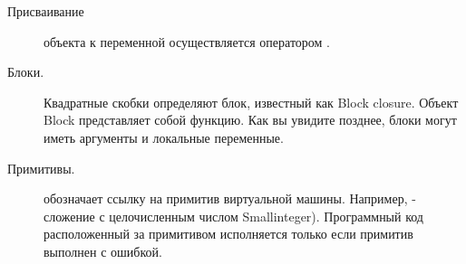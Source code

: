 \documentclass[a4paper,10pt,twoside]{book}
\begin{document}
\begin{description}
\item[Присваивание]	объекта к переменной осуществляется оператором \ct{:=}.

\item[Блоки.] Квадратные скобки \ct{[]} определяют блок, известный как Block closure.
	Объект Block представляет собой функцию.
	Как вы увидите позднее, блоки могут иметь аргументы и локальные переменные.

\item[Примитивы.]	 обозначает ссылку на примитив виртуальной машины.
	Например,  - сложение с целочисленным числом Smallinteger).
	Программный код расположенный за примитивом исполняется только если примитив выполнен с ошибкой.


\end{description}
\end{document}
